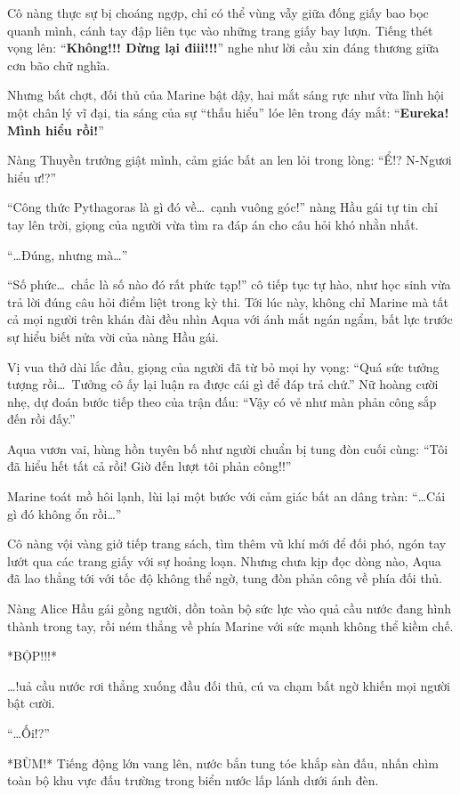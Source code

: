 \documentclass[../main.tex]{subfiles}
\begin{document}
Cô nàng thực sự bị choáng ngợp, chỉ có thể vùng vẫy giữa đống giấy bao bọc quanh mình, cánh tay đập liên tục vào những trang giấy bay lượn. Tiếng thét vọng lên: ``\textbf{Không!!! Dừng lại điii!!!}'' nghe như lời cầu xin đáng thương giữa cơn bão chữ nghĩa.

Nhưng bất chợt, đối thủ của Marine bật dậy, hai mắt sáng rực như vừa lĩnh hội một chân lý vĩ đại, tia sáng của sự ``thấu hiểu'' lóe lên trong đáy mắt: ``\textbf{Eureka! Mình hiểu rồi!}''

Nàng Thuyền trưởng giật mình, cảm giác bất an len lỏi trong lòng: ``Ể!? N-Ngươi hiểu ư!?''

``Công thức Pythagoras là gì đó về\dots\ cạnh vuông góc!'' nàng Hầu gái tự tin chỉ tay lên trời, giọng của người vừa tìm ra đáp án cho câu hỏi khó nhằn nhất.

``\dots Đúng, nhưng mà\dots''

``Số phức\dots\ chắc là số nào đó rất phức tạp!'' cô tiếp tục tự hào, như học sinh vừa trả lời đúng câu hỏi điểm liệt trong kỳ thi. Tới lúc này, không chỉ Marine mà tất cả mọi người trên khán đài đều nhìn Aqua với ánh mắt ngán ngẩm, bất lực trước sự hiểu biết nửa vời của nàng Hầu gái.

Vị vua thở dài lắc đầu, giọng của người đã từ bỏ mọi hy vọng: ``Quá sức tưởng tượng rồi\dots\ Tưởng cô ấy lại luận ra được cái gì để đáp trả chứ.'' Nữ hoàng cười nhẹ, dự đoán bước tiếp theo của trận đấu: ``Vậy có vẻ như màn phản công sắp đến rồi đấy.''

Aqua vươn vai, hùng hồn tuyên bố như người chuẩn bị tung đòn cuối cùng: ``Tôi đã hiểu hết tất cả rồi! Giờ đến lượt tôi phản công!!''

Marine toát mồ hôi lạnh, lùi lại một bước với cảm giác bất an dâng tràn: ``\dots  Cái gì đó không ổn rồi\dots''

Cô nàng vội vàng giở tiếp trang sách, tìm thêm vũ khí mới để đối phó, ngón tay lướt qua các trang giấy với sự hoảng loạn. Nhưng chưa kịp đọc dòng nào, Aqua đã lao thẳng tới với tốc độ không thể ngờ, tung đòn phản công về phía đối thủ.

Nàng Alice Hầu gái gồng người, dồn toàn bộ sức lực vào quả cầu nước đang hình thành trong tay, rồi ném thẳng về phía Marine với sức mạnh không thể kiềm chế.

*BỘP!!!*

\dots !uả cầu nước rơi thẳng xuống đầu đối thủ, cú va chạm bất ngờ khiến mọi người bật cười.

``\dots Ối!?''

*BÙM!* Tiếng động lớn vang lên, nước bắn tung tóe khắp sàn đấu, nhấn chìm toàn bộ khu vực đấu trường trong biển nước lấp lánh dưới ánh đèn.
\end{document}
